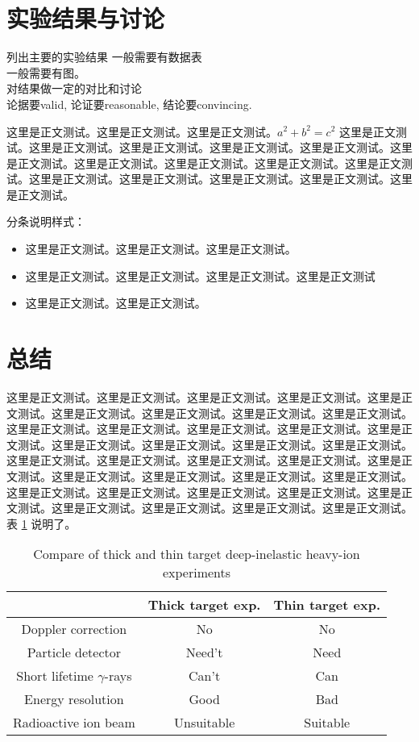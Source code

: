 \documentclass[prc,twocolumn,superscriptaddress,showkeys,showpacs,amssymb,amsmath,amsfonts,aps]{revtex4}
\begin{document}
\section{实验结果与讨论}%
列出主要的实验结果
一般需要有数据表\\
一般需要有图。\\
对结果做一定的对比和讨论\\

论据要valid, 论证要reasonable, 结论要convincing.

这里是正文测试。这里是正文测试。这里是正文测试。$a^2+b^2=c^2$ 这里是正文测试。这里是正文测试。这里是正文测试。这里是正文测试。这里是正文测试。这里是正文测试。这里是正文测试。这里是正文测试。这里是正文测试。这里是正文测试。这里是正文测试。这里是正文测试。这里是正文测试。这里是正文测试。这里是正文测试。

分条说明样式：
\begin{itemize}
\item 这里是正文测试。这里是正文测试。这里是正文测试。
\item 这里是正文测试。这里是正文测试。这里是正文测试。这里是正文测试
\item 这里是正文测试。这里是正文测试。
\end{itemize}


\section{总结}%
这里是正文测试。这里是正文测试。这里是正文测试。这里是正文测试。这里是正文测试。这里是正文测试。这里是正文测试。这里是正文测试。这里是正文测试。这里是正文测试。这里是正文测试。这里是正文测试。这里是正文测试。这里是正文测试。这里是正文测试。这里是正文测试。这里是正文测试。这里是正文测试。这里是正文测试。这里是正文测试。这里是正文测试。这里是正文测试。这里是正文测试。这里是正文测试。这里是正文测试。这里是正文测试。这里是正文测试。这里是正文测试。这里是正文测试。这里是正文测试。这里是正文测试。这里是正文测试。这里是正文测试。这里是正文测试。这里是正文测试。这里是正文测试。表 \ref{varelcoupl} 说明了。
\begin{table}
\caption{Compare of thick and thin target deep-inelastic heavy-ion experiments}
\begin{ruledtabular}
\begin{tabular}{ccc}
                                & Thick target exp. & Thin target exp.  \\      \hline
Doppler correction              & No                & No                \\
Particle detector               & Need't            & Need              \\
Short lifetime $\gamma$-rays    & Can't             & Can               \\
Energy resolution               & Good              & Bad               \\
Radioactive ion beam            & Unsuitable        & Suitable          \\
\end{tabular}
\end{ruledtabular}
\label{varelcoupl}
\end{table}
\end{document}
